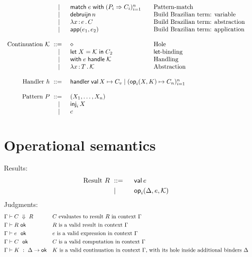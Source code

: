\documentclass{article}
\newcommand{\C}{C}     %
\newcommand{\K}{K}     %
\newcommand{\X}{X}     %
\newcommand{\rgn}{r}   %
\newcommand{\h}{h}     %
\newcommand{\KK}{{\cal K}} %
\newcommand{\val}{\mathsf{val}\,} %
\newcommand{\letin}[1]{\mathsf{let}\; #1 \;\mathsf{in}\;} %
\newcommand{\opPat}[3][i]{\mathsf{op}_{#1}(#2, #3)} %
\newcommand{\opRes}[4][i]{\mathsf{op}_{#1}(#2, #3, #4)} %
\newcommand{\withhandle}[1]{\mathsf{with}\;#1\;\mathsf{handle}\;} %
\newcommand{\abs}[1]{\mathsf{abs}\;#1\;\mathsf{in}\;} %
\newcommand{\ttlam}[2]{\lambda #1 \,{:}\, #2 \,.\,} %
\newcommand{\handler}[6][n]{\mathsf{handler}\; \val #2 \mapsto #3 \mid (\opPat{#4}{#5} \mapsto #6_{#1})_{i=1}^{#1}}
\newcommand{\makeApp}[2]{\mathsf{app}(#1,#2)} %
\newcommand{\debruijn}[1]{\mathsf{debruijn}\,#1} %
\newcommand{\hole}{\diamond}
\newcommand{\tuple}[1]{(#1)}
\newcommand{\pat}{P}
\newcommand{\match}[2]{\mathsf{match}\; #1\; \mathsf{with}\;#2}
\newcommand{\genericPats}[1][n]{(\pat_i \Rightarrow \C_i)_{i=1}^n}
\newcommand{\genericmatch}[1][\e]{\match{#1}{\genericPats}}
\renewcommand{\c}{c} %
\newcommand{\inj}[2][i]{\mathsf{inj}_{#1}\, #2}
\newcommand{\evalto}[3][\G]{#1 \vdash #2 \ \Downarrow\  #3}
\newcommand{\resultok}[2][\G]{#1 \vdash #2 \ \mathsf{ok}}
\newcommand{\eok}[2][\G]{#1 \vdash #2 \ \ \mathsf{ok}}
\newcommand{\cok}[2][\G]{#1 \vdash #2 \ \ \mathsf{ok}}
\newcommand{\kok}[3][\G]{#1 \vdash #3 \ : \ #2\to\mathsf{ok}}
\newcommand{\typicalhandler}{\handler{\X}{\C_v}{\X}{\K}{\C}}
\begin{document}
\begin{equation*}
\begin{array}{rl@{\qquad}l}
    \bnfor  & \genericmatch& \text{Pattern-match}\\
    \bnfor  & \debruijn{n} & \text{Build Brazilian term: variable} \\
    \bnfor  & \ttlam{\x}{\e} \C   & \text{Build Brazilian term: abstraction} \\
    \bnfor  & \makeApp{\e_1}{\e_2} & \text{Build Brazilian term: application} \\
    \\
    \text{Continuation $\KK$} \bnf    & \hole                & \text{Hole} \\
    \bnfor  & \letin{\X = \KK} \C_2  & \text{$\mathsf{let}$-binding} \\
    \bnfor  & \withhandle{\e} \KK & \text{Handling} \\
    \bnfor  & \ttlam{\x}{\T}{\KK} & \text{Abstraction} \\
    \\

  \text{Handler $\h$}
  \bnf & \multicolumn{2}{l}{\typicalhandler}\\
  \\
  \text{Pattern $\pat$}
  \bnf & \tuple{\X_1,\ldots,\X_n}\\
  \bnfor & \inj{\X}\\
  \bnfor & \c\\
\end{array}
\end{equation*}



\section{Operational semantics}
\label{sec:oper-semant}

Results:
%
\begin{equation*}
  \text{Result $R$}
  \begin{aligned}[t]
    &\bnf   {} && \val \e \\
    &\bnfor {} && \opRes{\D}{\e}{\KK} \\
  \end{aligned}
\end{equation*}
%
Judgments:
%
\begin{align*}
  &\evalto[\G]{C}{R} &&\text{$C$ evaluates to result $R$ in context $\G$} \\
  &\resultok[\G]{R}  &&\text{$R$ is a valid result in context $\G$} \\
  &\eok[\G]{\e} &&\text{$\e$ is a valid expression in context $\G$} \\
  &\cok[\G]{\C} &&\text{$\C$ is a valid computation in context $\G$} \\
  &\kok[\G]{\D}{\K} &&\text{$\K$ is a valid continuation in context $\G$,
                              with its hole inside additional binders $\D$} \\
\end{align*}
%
\end{document}
